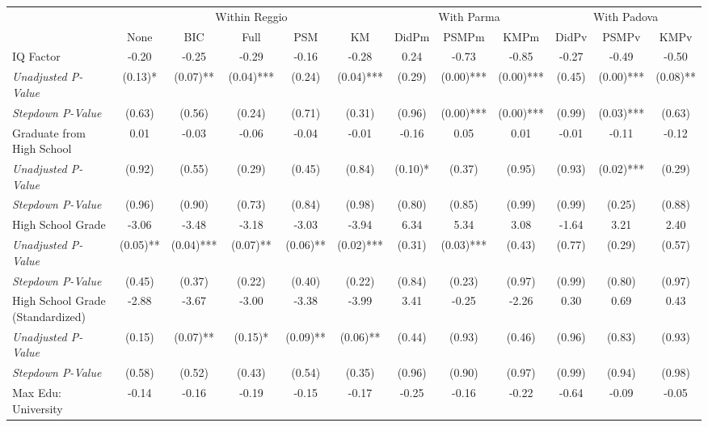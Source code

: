 \begin{tabular}{l c c c c c c c c c c c}
\toprule
& \multicolumn{5}{c}{Within Reggio} & \multicolumn{3}{c}{With Parma} & \multicolumn{3}{c}{With Padova} \\\cmidrule(lr){2-6} \cmidrule(lr){7-9} \cmidrule(lr){10-12}
 & None & BIC & Full & PSM & KM & DidPm & PSMPm & KMPm & DidPv & PSMPv & KMPv \\
\midrule
IQ Factor & -0.20 & -0.25 & -0.29 & -0.16 & -0.28 & 0.24 & -0.73 & -0.85 & -0.27 & -0.49 & -0.50 \\
\quad \textit{Unadjusted P-Value} & (0.13)* & (0.07)** & (0.04)*** & (0.24) & (0.04)*** & (0.29) & (0.00)*** & (0.00)*** & (0.45) & (0.00)*** & (0.08)** \\
\quad \textit{Stepdown P-Value} & (0.63) & (0.56) & (0.24) & (0.71) & (0.31) & (0.96) & (0.00)*** & (0.00)*** & (0.99) & (0.03)*** & (0.63) \\
Graduate from High School & 0.01 & -0.03 & -0.06 & -0.04 & -0.01 & -0.16 & 0.05 & 0.01 & -0.01 & -0.11 & -0.12 \\
\quad \textit{Unadjusted P-Value} & (0.92) & (0.55) & (0.29) & (0.45) & (0.84) & (0.10)* & (0.37) & (0.95) & (0.93) & (0.02)*** & (0.29) \\
\quad \textit{Stepdown P-Value} & (0.96) & (0.90) & (0.73) & (0.84) & (0.98) & (0.80) & (0.85) & (0.99) & (0.99) & (0.25) & (0.88) \\
High School Grade & -3.06 & -3.48 & -3.18 & -3.03 & -3.94 & 6.34 & 5.34 & 3.08 & -1.64 & 3.21 & 2.40 \\
\quad \textit{Unadjusted P-Value} & (0.05)** & (0.04)*** & (0.07)** & (0.06)** & (0.02)*** & (0.31) & (0.03)*** & (0.43) & (0.77) & (0.29) & (0.57) \\
\quad \textit{Stepdown P-Value} & (0.45) & (0.37) & (0.22) & (0.40) & (0.22) & (0.84) & (0.23) & (0.97) & (0.99) & (0.80) & (0.97) \\
High School Grade (Standardized) & -2.88 & -3.67 & -3.00 & -3.38 & -3.99 & 3.41 & -0.25 & -2.26 & 0.30 & 0.69 & 0.43 \\
\quad \textit{Unadjusted P-Value} & (0.15) & (0.07)** & (0.15)* & (0.09)** & (0.06)** & (0.44) & (0.93) & (0.46) & (0.96) & (0.83) & (0.93) \\
\quad \textit{Stepdown P-Value} & (0.58) & (0.52) & (0.43) & (0.54) & (0.35) & (0.96) & (0.90) & (0.97) & (0.99) & (0.94) & (0.98) \\
Max Edu: University & -0.14 & -0.16 & -0.19 & -0.15 & -0.17 & -0.25 & -0.16 & -0.22 & -0.64 & -0.09 & -0.05 \\

\end{tabular}
